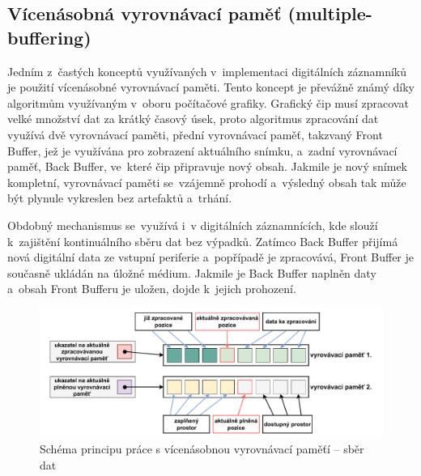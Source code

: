 \subsection{Vícenásobná vyrovnávací paměť (multiple-buffering)}
\label{vicenasobna_vyrovnavaci_pamet}
Jedním z~častých konceptů využívaných v~implementaci digitálních záznamníků je použití vícenásobné vyrovnávací paměti. Tento koncept je převážně známý díky algoritmům využívaným v~oboru počítačové grafiky. Grafický čip musí zpracovat velké množství dat za krátký časový úsek, proto algoritmus zpracování dat využívá dvě vyrovnávací paměti, přední vyrovnávací paměť, takzvaný Front Buffer, jež je využívána pro zobrazení aktuálního snímku, a~zadní vyrovnávací paměť, Back Buffer, ve~které čip připravuje nový obsah. Jakmile je nový snímek kompletní, vyrovnávací paměti se~vzájemně prohodí a~výsledný obsah tak může být plynule vykreslen bez artefaktů a~trhání.~\cite{double_buffering_model}

Obdobný mechanismus se~využívá i~v digitálních záznamnících, kde slouží k~zajištění kontinuálního sběru dat bez výpadků. Zatímco Back Buffer přijímá nová digitální data ze vstupní periferie a~popřípadě je zpracovává, Front Buffer je současně ukládán na úložné médium. Jakmile je Back Buffer naplněn daty a~obsah Front Bufferu je uložen, dojde k~jejich prohození.

\begin{figure}[h]
    \centering
    \includegraphics[width=1.00\textwidth]{obrazky-figures/multiple_buffering-1.pdf}
    
    \caption{Schéma principu práce s vícenásobnou vyrovnávací paměťí -- sběr dat}
    \label{fig:multiple-buffering-1}
\end{figure}


